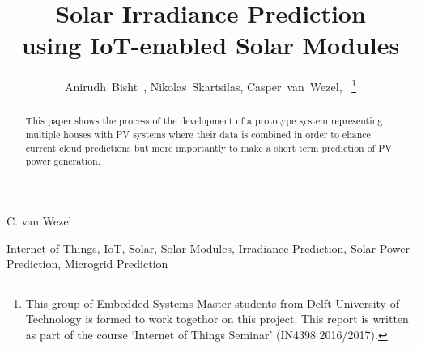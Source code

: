 \documentclass[a4paper,journal]{DDREAM}
\begin{document}
%
\title{\vspace*{0.0cm} Solar Irradiance Prediction \\ using IoT-enabled Solar Modules}
%
%
\author{\vspace*{0.0cm}Anirudh~Bisht~,
Nikolas~Skartsilas,
Casper~van~Wezel,~%
\thanks{\footnotesize{This group of Embedded Systems Master students from Delft University of Technology is formed to work togethor on this project.
This report is written as part of the course `Internet of Things Seminar' (IN4398 2016/2017).}}%
}

%
{C. van Wezel}%
\maketitle


\begin{abstract}
This paper shows the process of the development of a prototype system representing multiple houses with PV systems where their data is combined in order to ehance current cloud predictions but more importantly to make a short term prediction of PV power generation.
\end{abstract}

\begin{IEEEkeywords}
Internet of Things, IoT, Solar, Solar Modules, Irradiance Prediction, Solar Power Prediction, Microgrid Prediction
\end{IEEEkeywords}
\end{document}
